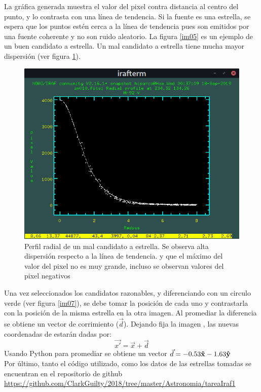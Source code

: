 \documentclass[12pt]{article}
\begin{document}
La gráfica generada muestra el valor del pixel contra distancia al centro del punto, y lo contrasta con una línea de tendencia. Si la fuente es una estrella, se espera que los puntos estén cerca a la línea de tendencia pues son emitidos por una fuente coherente y no son ruido aleatorio. La figura \ref{im05} es un ejemplo de un buen candidato a estrella. Un mal candidato a estrella tiene mucha mayor dispersión (ver figura \ref{im06}). 



\begin{figure}[H]
  \centering
   \includegraphics[scale= 0.6]{im05.png}
  \caption{Perfil radial de un mal candidato a estrella. Se observa alta dispersión respecto a la línea de tendencia. y que el máximo del valor del pixel no es muy grande, incluso se observan valores del pixel negativos}
  \label{im06}
\end{figure}

Una vez seleccionados los candidatos razonables, y diferenciando con un circulo verde (ver figura \ref{im07}), se debe tomar la posición de cada uno y contrastarla con la posición de la misma estrella en la otra imagen. Al promediar la diferencia se obtiene un vector de corrimiento ($\vec{d}$). Dejando fija la imagen , las nuevas coordenadas de  estarán dadas por:
\begin{equation}
\vec{x'}= \vec{x} + \vec{d}
\end{equation}
Usando Python para promediar se obtiene un vector $\vec{d} = -0.53\vu{x} -1.63\vu{y}$\\
Por último, tanto el código utilizado, como los datos de las estrellas tomadas se  encuentran en el repositorio de github \url{https://github.com/ClarkGuilty/2018/tree/master/Astronomia/tareaIraf1}
\end{document}

